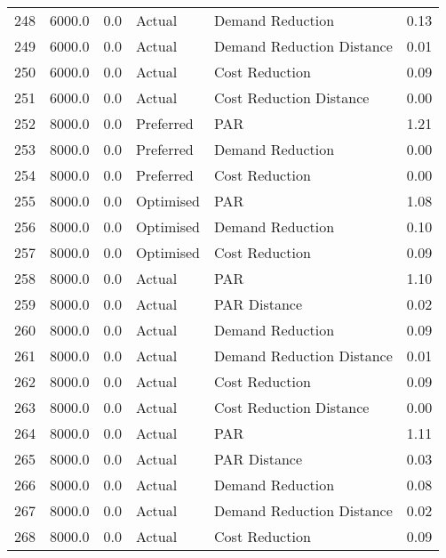\begin{longtable}{lrrllr}
248  &       6000.0 &     0.0 &         Actual &           Demand Reduction &   0.13 \\
249  &       6000.0 &     0.0 &         Actual &  Demand Reduction Distance &   0.01 \\
250  &       6000.0 &     0.0 &         Actual &             Cost Reduction &   0.09 \\
251  &       6000.0 &     0.0 &         Actual &    Cost Reduction Distance &   0.00 \\
252  &       8000.0 &     0.0 &      Preferred &                        PAR &   1.21 \\
253  &       8000.0 &     0.0 &      Preferred &           Demand Reduction &   0.00 \\
254  &       8000.0 &     0.0 &      Preferred &             Cost Reduction &   0.00 \\
255  &       8000.0 &     0.0 &      Optimised &                        PAR &   1.08 \\
256  &       8000.0 &     0.0 &      Optimised &           Demand Reduction &   0.10 \\
257  &       8000.0 &     0.0 &      Optimised &             Cost Reduction &   0.09 \\
258  &       8000.0 &     0.0 &         Actual &                        PAR &   1.10 \\
259  &       8000.0 &     0.0 &         Actual &               PAR Distance &   0.02 \\
260  &       8000.0 &     0.0 &         Actual &           Demand Reduction &   0.09 \\
261  &       8000.0 &     0.0 &         Actual &  Demand Reduction Distance &   0.01 \\
262  &       8000.0 &     0.0 &         Actual &             Cost Reduction &   0.09 \\
263  &       8000.0 &     0.0 &         Actual &    Cost Reduction Distance &   0.00 \\
264  &       8000.0 &     0.0 &         Actual &                        PAR &   1.11 \\
265  &       8000.0 &     0.0 &         Actual &               PAR Distance &   0.03 \\
266  &       8000.0 &     0.0 &         Actual &           Demand Reduction &   0.08 \\
267  &       8000.0 &     0.0 &         Actual &  Demand Reduction Distance &   0.02 \\
268  &       8000.0 &     0.0 &         Actual &             Cost Reduction &   0.09 \\

\end{longtable}
